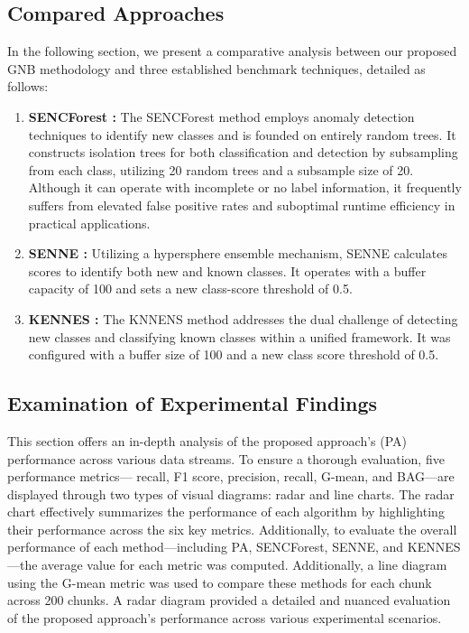 \subsection{Compared Approaches}
\label{sec:compared_approaches}
In the following section, we present a comparative analysis between our proposed GNB methodology and three established benchmark techniques, detailed as follows:
\begin{enumerate}
	\item \textbf{SENCForest \cite{mu2017classification}:} The SENCForest method employs anomaly detection techniques to identify new classes and is founded on entirely random trees. It constructs isolation trees for both classification and detection by subsampling from each class, utilizing 20 random trees and a subsample size of 20. Although it can operate with incomplete or no label information, it frequently suffers from elevated false positive rates and suboptimal runtime efficiency in practical applications.
	\item \textbf{SENNE \cite{zhu2020semi}:} Utilizing a hypersphere ensemble mechanism, SENNE calculates scores to identify both new and known classes. It operates with a buffer capacity of 100 and sets a new class-score threshold of 0.5.
	\item \textbf{KENNES \cite{zhang2022knnens}:} The KNNENS method addresses the dual challenge of detecting new classes and classifying known classes within a unified framework. It was configured with a buffer size of 100 and a new class score threshold of 0.5.
\end{enumerate}



\subsection{Examination of Experimental Findings}
\label{sec:finding}
This section offers an in-depth analysis of the proposed approach's (PA) performance across various data streams. To ensure a thorough evaluation, five performance metrics— recall, F1 score, precision, recall, G-mean, and BAG—are displayed through two types of visual diagrams: radar and line charts. The radar chart effectively summarizes the performance of each algorithm by highlighting their performance across the six key metrics. Additionally, to evaluate the overall performance of each method—including PA, SENCForest, SENNE, and KENNES—the average value for each metric was computed. Additionally, a line diagram using the G-mean metric was used to compare these methods for each chunk across 200 chunks. A radar diagram provided a detailed and nuanced evaluation of the proposed approach’s performance across various experimental scenarios.

